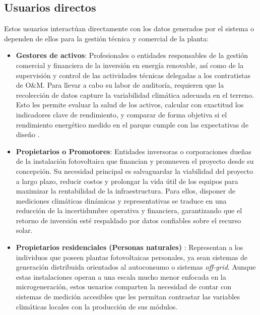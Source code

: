 \documentclass[../../General.tex]{subfiles}
\begin{document}
\subsection{Usuarios directos}
Estos usuarios interactúan directamente con los datos generados por el sistema o dependen de ellos para la gestión técnica y comercial de la planta:

\begin{itemize}

    
    \item \textbf{Gestores de activos}: Profesionales o entidades responsables de la gestión comercial y financiera de la inversión en energía renovable, así como de la supervisión y control de las actividades técnicas delegadas a los contratistas de O\&M. Para llevar a cabo su labor de auditoría, requieren que la recolección de datos capture la variabilidad climática adecuada en el terreno. Esto les permite evaluar la salud de los activos, calcular con exactitud los indicadores clave de rendimiento, y comparar de forma objetiva si el rendimiento energético medido en el parque cumple con las expectativas de diseño \citep{ProyectoEjecutivo2024}.
    
    \item \textbf{Propietarios o Promotores}: Entidades inversoras o corporaciones dueñas de la instalación fotovoltaica que financian y promueven el proyecto desde su concepción. Su necesidad principal es salvaguardar la viabilidad del proyecto a largo plazo, reducir costos y prolongar la vida útil de los equipos para maximizar la rentabilidad de la infraestructura. Para ellos, disponer de mediciones climáticas dinámicas y representativas se traduce en una reducción de la incertidumbre operativa y financiera, garantizando que el retorno de inversión esté respaldado por datos confiables sobre el recurso solar\citep{ProyectoEjecutivo2024}.
    
    \item \textbf{Propietarios residenciales (Personas naturales)} : Representan a los individuos que poseen plantas fotovoltaicas personales, ya sean sistemas de generación distribuida orientados al autoconsumo o sistemas \textit{off-grid}. Aunque estas instalaciones operan a una escala mucho menor enfocada en la microgeneración, estos usuarios comparten la necesidad de contar con sistemas de medición accesibles que les permitan contrastar las variables climáticas locales con la producción de sus módulos. 
\end{itemize}
\end{document}
